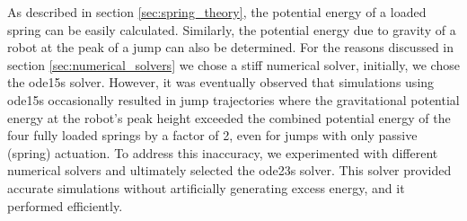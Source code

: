 As described in section \ref{sec:spring_theory}, the potential energy of a loaded spring can be easily calculated. Similarly, the potential energy due to gravity of a robot at the peak of a jump can also be determined. For the reasons discussed in section \ref{sec:numerical_solvers} we chose a stiff numerical solver, initially, we chose the ode15s solver. However, it was eventually observed that simulations using ode15s occasionally resulted in jump trajectories where the gravitational potential energy at the robot's peak height exceeded the combined potential energy of the four fully loaded springs by a factor of 2, even for jumps with only passive (spring) actuation. To address this inaccuracy, we experimented with different numerical solvers and ultimately selected the ode23s solver. This solver provided accurate simulations without artificially generating excess energy, and it performed efficiently.





